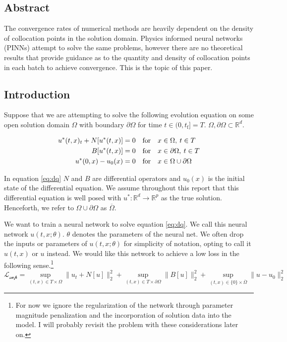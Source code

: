 \documentclass[12pt]{article}
\begin{document}
\subsection{Abstract}

The convergence rates of numerical methods are heavily dependent on the density of collocation points in the solution domain. Physics informed neural networks (PINNs) attempt to solve the same problems, however there are no theoretical results that provide guidance as to the quantity and density of collocation points in each batch to achieve convergence. This is the topic of this paper.

\subsection{Introduction}

Suppose that we are attempting to solve the following evolution equation on some open solution domain $\Omega$ with boundary $\partial \Omega$ for time $t \in (0,t_{\text{f}}] = T$. $\Omega, \partial \Omega \subset \mathbb{R}^d$.

\begin{align} 
	u^*(t,x)_t + N[u^*(t,x)] = 0& \quad \text{for} \quad x \in \Omega, \: t \in T \notag\\
	B[u^*(t,x)] = 0& \quad \text{for} \quad x \in \partial \Omega , \: t \in T\\
	u^*(0,x) - u_0(x) = 0& \quad \text{for} \quad x \in \Omega \cup \partial \Omega \notag
\end{align} \label{eq:dq}

\noindent In equation \ref{eq:dq} $N$ and $B$ are differential operators and $u_0(x)$ is the initial state of the differential equation. We assume throughout this report that this differential equation is well posed with $u^*: \mathbb{R}^d \to \mathbb{R}^p$ as the true solution. Henceforth, we refer to $\Omega \cup \partial \Omega$ as $\overline{\Omega}$.

We want to train a neural network to solve equation \ref{eq:dq}. We call this neural network $u(t,x;\theta)$. $\theta$ denotes the parameters of the neural net. We often drop the inputs or parameters of $u(t,x;\theta)$ for simplicity of notation, opting to call it $u(t,x)$ or $u$ instead. We would like this network to achieve a low loss in the following sense.\footnote{For now we ignore the regularization of the network through parameter magnitude penalization and the incorporation of solution data into the model. I will probably revisit the problem with these considerations later on.}
\begin{equation}
\mathcal{L_{\text{sup}}} = \sup_{(t,x) \in T \times\Omega} \| u_t + N[u] \|_2^2 + \sup_{(t,x) \in T \times \partial \Omega} \| B[u] \|_2^2 + \sup_{(t,x) \in \{0\} \times \overline{\Omega}} \| u - u_0 \|_2^2
\end{equation}
\end{document}
